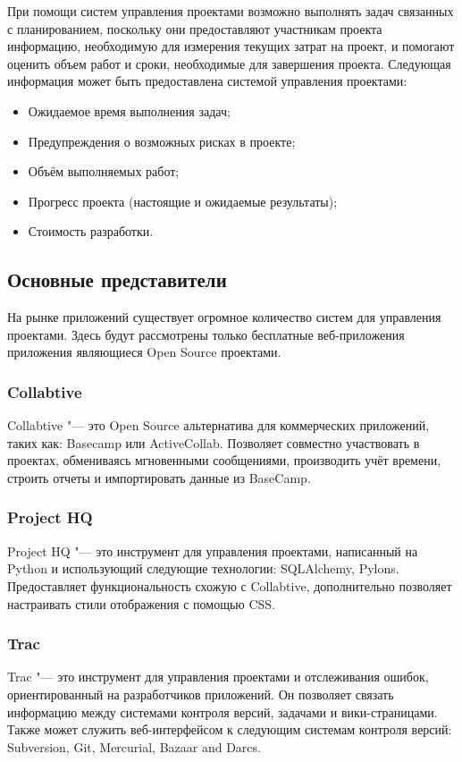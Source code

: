 При помощи систем управления проектами возможно выполнять  задач
связанных с планированием, поскольку они предоставляют участникам проекта
информацию, необходимую для измерения текущих затрат на проект, и помогают
оценить объем работ и сроки, необходимые для завершения проекта. Следующая
информация может быть предоставлена системой управления проектами:
\begin{itemize}
  \item Ожидаемое время выполнения задач;
  \item Предупреждения о возможных рисках в проекте;
  \item Объём выполняемых работ;
  \item Прогресс проекта (настоящие и ожидаемые результаты);
  \item Стоимость разработки.
\end{itemize}


\subsection{Основные представители}

На рынке приложений существует огромное количество систем для управления
проектами. Здесь будут рассмотрены только бесплатные веб-приложения
приложения являющиеся Open Source проектами.

\subsubsection{Collabtive}
Collabtive "--- это Open Source альтернатива для коммерческих приложений, таких
как: Basecamp или ActiveCollab. Позволяет совместно участвовать в
проектах, обмениваясь мгновенными сообщениями, производить учёт времени,
строить отчеты и импортировать данные из BaseCamp.

\subsubsection{Project HQ}
Project HQ "--- это инструмент для управления проектами, написанный на Python и
использующий следующие технологии: SQLAlchemy, Pylons. Предоставляет
функциональность схожую с Collabtive, дополнительно позволяет настраивать стили
отображения с помощью CSS.

\subsubsection{Trac}
Trac "--- это инструмент для управления проектами и отслеживания ошибок,
ориентированный на разработчиков приложений. Он позволяет связать информацию
между системами контроля версий, задачами и вики-страницами. Также может
служить веб-интерфейсом к следующим системам контроля версий: Subversion, Git,
Mercurial, Bazaar and Darcs.

